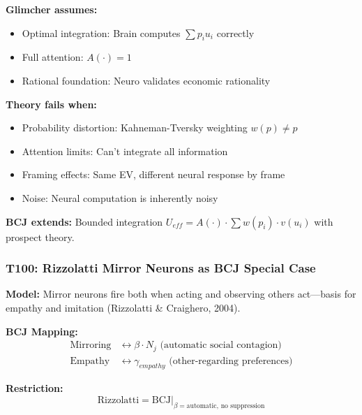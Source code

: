 \begin{tcolorbox}[colback=red!5!white, colframe=red!75!black,
    title=Boundary Condition: Where Glimcher Fails]
\textbf{Glimcher assumes:}
\begin{itemize}[nosep]
\item Optimal integration: Brain computes $\sum p_i u_i$ correctly
\item Full attention: $A(\cdot) = 1$
\item Rational foundation: Neuro validates economic rationality
\end{itemize}

\textbf{Theory fails when:}
\begin{itemize}[nosep]
\item Probability distortion: Kahneman-Tversky weighting $w(p) \neq p$
\item Attention limits: Can't integrate all information
\item Framing effects: Same EV, different neural response by frame
\item Noise: Neural computation is inherently noisy
\end{itemize}

\textbf{BCJ extends:} Bounded integration $U_{eff} = A(\cdot) \cdot \sum w(p_i) \cdot v(u_i)$ with prospect theory.
\end{tcolorbox}

\subsubsection*{T100: Rizzolatti Mirror Neurons as BCJ Special Case}

\textbf{Model:} Mirror neurons fire both when acting and observing others act---basis for empathy and imitation (Rizzolatti \& Craighero, 2004).

\textbf{BCJ Mapping:}
\begin{align}
\text{Mirroring} &\leftrightarrow \beta \cdot N_j \text{ (automatic social contagion)} \\
\text{Empathy} &\leftrightarrow \gamma_{empathy} \text{ (other-regarding preferences)}
\end{align}

\textbf{Restriction:}
\begin{equation}
\text{Rizzolatti} = \text{BCJ} \big|_{\beta = \text{automatic}, \, \text{no suppression}}
\end{equation}


